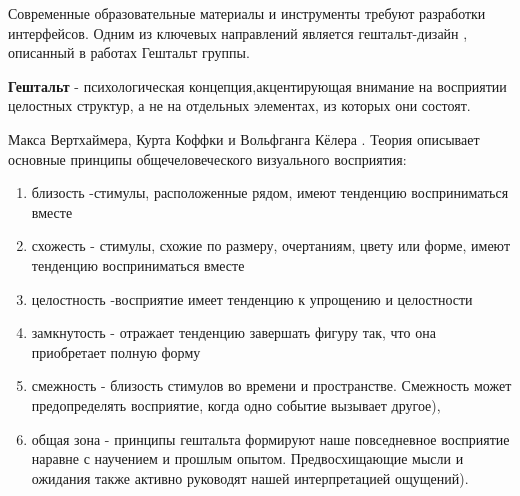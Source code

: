 Современные образовательные материалы и инструменты требуют разработки интерфейсов. 
Одним из ключевых направлений является гештальт-дизайн \cite{wertheimer1938laws}, описанный в работах Гештальт группы.

 \textbf{Гештальт} - психологическая концепция,акцентирующая внимание на восприятии целостных структур, а не на отдельных элементах, из которых они состоят.




Макса Вертхаймера, Курта Коффки и Вольфганга Кёлера . Теория описывает основные принципы общечеловеческого визуального восприятия: 
\begin{enumerate}
    \item близость -стимулы, расположенные рядом, имеют тенденцию восприниматься вместе
    \item схожесть - стимулы, схожие по размеру, очертаниям, цвету или форме, имеют тенденцию восприниматься вместе
    \item целостность -восприятие имеет тенденцию к упрощению и целостности
    \item замкнутость - отражает тенденцию завершать фигуру так, что она приобретает полную форму
    \item смежность - близость стимулов во времени и пространстве. Смежность может предопределять восприятие, когда одно событие вызывает другое),
    \item общая зона - принципы гештальта формируют наше повседневное восприятие наравне с научением и прошлым опытом. Предвосхищающие мысли и ожидания также активно руководят нашей интерпретацией ощущений).
\end{enumerate}


